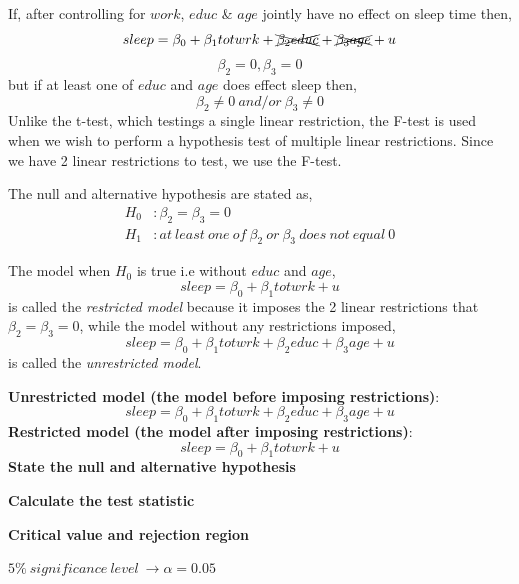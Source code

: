 \documentclass[12pt]{report}
\begin{document}
\noindent \noindent If, after controlling for $work$, $educ$ \& $age$ jointly have no effect on sleep time then,
$$sleep = \beta_0 + \beta_1 totwrk + \xcancel{\beta_2 educ} + \xcancel{\beta_3 age} + u$$
$$\beta_2 = 0, \beta_3 = 0$$ 
\noindent but if at least one of $educ$ and $age$ does effect sleep then,
$$\beta_2 \neq 0\ and/or\ \beta_3 \neq 0$$ Unlike the t-test, which testings a single linear restriction, the F-test is used when we wish to perform a hypothesis test of multiple linear restrictions. Since we have 2 linear restrictions to test, we use the F-test.

\noindent The null and alternative hypothesis are stated as, \begin{align*}
	H_0&: \beta_2 = \beta_3 = 0 \\
	H_1&: at\ least\ one\ of\ \beta_2\ or\ \beta_3\ does\ not\ equal\ 0
\end{align*}

\noindent The model when $H_0$ is true i.e without $educ$ and $age$, $$sleep = \beta_0 + \beta_1 totwrk + u$$ is called the \textit{restricted model} because it imposes the 2 linear restrictions that $\beta_2 = \beta_3 = 0$, while the model without any restrictions imposed, $$sleep = \beta_0 + \beta_1 totwrk + \beta_2 educ + \beta_3 age + u$$ is called the \textit{unrestricted model}.

\newpage
\noindent \textbf{Unrestricted model (the model before imposing restrictions)}:
$$sleep = \beta_0 + \beta_1 totwrk + \beta_2 educ + \beta_3 age + u$$ \textbf{Restricted model (the model after imposing restrictions)}: $$sleep = \beta_0 + \beta_1 totwrk + u$$ \textbf{State the null and alternative hypothesis}

\textbf{Calculate the test statistic}

\textbf{Critical value and rejection region}

\noindent $5\%\ significance\ level\ \to \alpha = 0.05$
\end{document}

